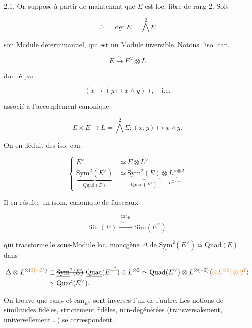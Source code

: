 2.1. On suppose à partir de maintenant que $E$ est loc. libre de rang 2. Soit

\[L=\underline{\det}E=\bigwedge^2 E\]

son Module déterminantiel, qui est un Module inversible. Notons l'iso. can.

\[E\xrightarrow{\sim} E^\vee\otimes L\]

donné par

\[(x\longmapsto(y\longmapsto x\wedge y)),\quad\text{i.e.}\]

associé à l'accouplement canonique

\[E\times E\longrightarrow L=\bigwedge^2 E:(x,y)\longmapsto x\wedge y.\]

On en déduit des iso. can.

\[
\left\{\begin{aligned}
E^\vee&\simeq E\otimes L^\vee\\
\underbrace{\mathrm{Sym}^2(E^\vee)}_{\underline{\mathrm{Quad}}(E)}
&\simeq\underbrace{\mathrm{Sym}^2(E)}_{\underline{\mathrm{Quad}}(E^\vee)}\otimes
\underbrace{L^{\vee\otimes2}}_{L^{\otimes(-2)}}
\end{aligned}\right.
\]


Il en résulte un isom. canonique de faisceaux

\[\underline{\mathrm{Sim}}(E)\xrightarrow{\substack{\mathrm{can}_E\\\sim}}\underline{\mathrm{Sim}}(E^\vee)\]

qui transforme le sous-Module loc. monogène $\Delta$ de $\underline{\mathrm{Sym}}^2(E^\vee)\simeq\mathrm{Quad}(E)$ dans

\[
\begin{aligned}
\Delta\otimes L^{\otimes(\unsure{2|-2})}&\subset
\deleted{\underline{\mathrm{Sym}}^2(E)}\ \underline{\mathrm{Quad}}(E^{\deleted{\unsure{\vee}}})\otimes L^{\otimes2}
\simeq \mathrm{Quad}(E^\vee)\otimes L^{\otimes(-2)}\inserted{\unsure{\otimes L^{\otimes2}|\otimes2}}\\
&\simeq\mathrm{Quad}(E^\vee).
\end{aligned}
\]

On trouve que $\mathrm{can}_E$ et $\mathrm{can}_{E^\vee}$ sont inverses l'un de l'autre. Les notions de  similitudes \uline{fidèles}, strictement fidèles, non-dégénérées (transversalement, universellement \ldots)  se correspondent.

